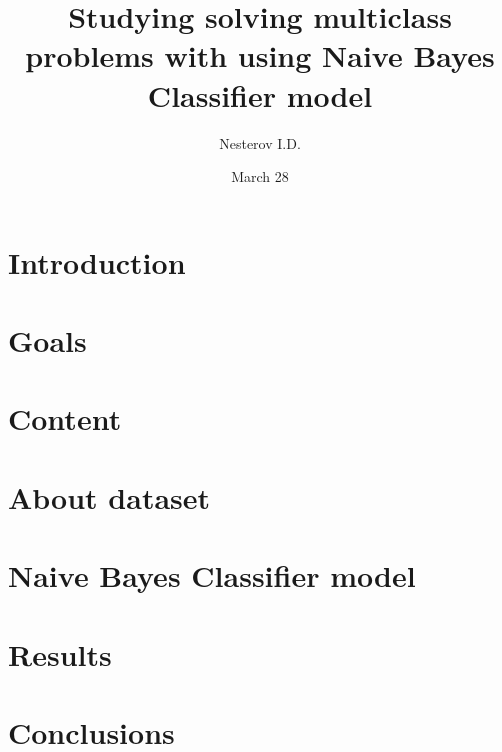 \documentclass[14pt, letterpaper]{article}
\title{Studying solving multiclass problems with using Naive Bayes Classifier model}
\author{Nesterov I.D.}
\date{March 28}
\begin{document}
    \maketitle
    \tableofcontents

    \section{Introduction}
    \section{Goals}
    \section{Content}
        \section{About dataset}
        \section{Naive Bayes Classifier model}
    \section{Results}
    \section{Conclusions}
\end{document}
